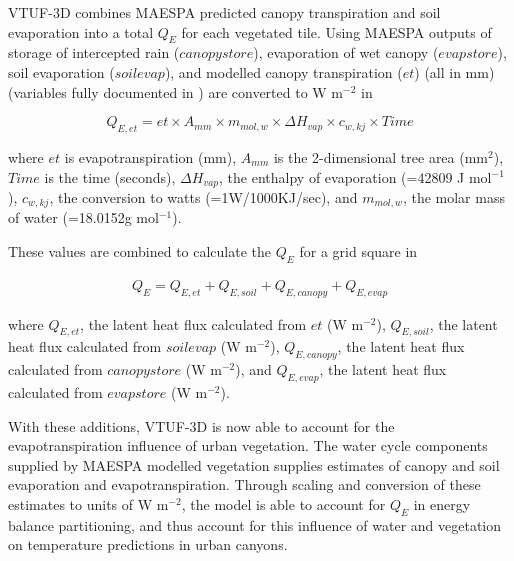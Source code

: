 \documentclass[final,3p,times,authoryear]{elsarticle}
\begin{document}
VTUF-3D combines MAESPA predicted canopy transpiration and soil evaporation into a total $Q_{E}$ for each vegetated tile. Using MAESPA outputs of storage of intercepted rain ($canopystore$), evaporation of wet canopy ($evapstore$), soil evaporation ($soilevap$), and modelled canopy transpiration ($et$) (all in mm) (variables fully documented in \cite{Duursma2016}) are converted to W m$^{-2}$ in 

\begin{equation}\label{eq:mmtowm2} 
  Q_{E,et} = et \times A _{mm} \times m_{mol,w} \times \Delta H_{vap} \times c_{w,kj} \times Time  
\end{equation} 
 
where $et$ is evapotranspiration (mm), $A _{mm}$ is the 2-dimensional tree area (mm$^{2}$), $Time$ is the time (seconds), $\Delta H_{vap}$, the enthalpy of evaporation (=42809 J mol$^{-1}$), $c_{w,kj}$, the conversion to watts (=1W/1000KJ/sec), and $m_{mol,w}$, the molar mass of water (=18.0152g mol$^{-1}$).

These values are combined to calculate the $Q_{E}$ for a grid square in 


\begin{equation}\label{eq:lefromet} 
\begin{aligned}
Q_{E} = Q_{E,et} + Q_{E,soil} + Q_{E,canopy} + Q_{E,evap} 
\end{aligned}
\end{equation}

where $Q_{E,et}$, the latent heat flux calculated from $et$ (W m$^{-2}$), $Q_{E,soil}$, the latent heat flux calculated from $soilevap$ (W m$^{-2}$), $Q_{E,canopy}$, the latent heat flux calculated from $canopystore$ (W m$^{-2}$), and $Q_{E,evap}$, the latent heat flux calculated from $evapstore$ (W m$^{-2}$).

With these additions, VTUF-3D is now able to account for the evapotranspiration influence of urban vegetation. The water cycle components supplied by MAESPA modelled vegetation supplies estimates of canopy and soil evaporation and evapotranspiration. Through scaling and conversion of these estimates to units of W m$^{-2}$, the model is able to account for $Q_{E}$ in energy balance partitioning, and thus account for this influence of water and vegetation on temperature predictions in urban canyons.
\end{document}
